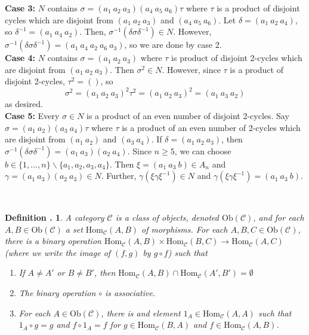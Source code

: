 \documentclass[twoside]{report}
\newcommand{\br}{\centering{ * \quad * \quad *} \\  }
\newcommand{\Ob}{\textrm{Ob}}
\newcommand{\Hom}{\textrm{Hom}}
\newcommand{\fanC}{\mathscr{C}}
\newcounter{Lecture}
\theoremstyle{myts}
\newcounter{c}[Lecture]
\newtheorem{dfn}[c]{Definition \arabic{Lecture}.}
\newcounter{ex}
\newenvironment{prf}{
  \noindent\begin{mdframed}[style=prf]}{\end{mdframed} \vspace{1em}
}
\begin{document}
\begin{prf}
  {\bf Case 3:} $N$ contains \( \sigma = ( a_1 \: a_2 \: a_3 ) ( a_4 \: a_5 \: a_6) \tau \) where $\tau$ is a product of disjoint cycles which are disjoint from \( ( a_1 \: a_2 \: a_3 ) \) and \( ( a_4 \: a_5 \: a_6 ) \). Let \( \delta = ( a_1 \: a_2 \: a_4 ) \), so \( \delta^{-1} = ( a_1 \: a_4 \: a_2 ) \). Then, \(\sigma^{-1} ( \delta\sigma\delta^{-1} ) \in N \). However, \( \sigma^{-1} ( \delta\sigma\delta^{-1} ) = ( a_1 \: a_4 \: a_2 \: a_6 \: a_3 ) \), so we are done by case 2. \\
  {\bf Case 4:} $N$ contains \( \sigma  = ( a_1 \: a_2 \: a_3 ) \) where $\tau$ is product of disjoint 2-cycles which are disjoint from \( ( a_1 \: a_2 \: a_3 ) \). Then \( \sigma^2 \in N \). However, since $\tau$ is a product of disjoint 2-cycles, \( \tau^2 = ( ) \), so
  \[
    \sigma^2 = ( a_1 \: a_2 \: a_3 )^2 \tau^2 = ( a_1 \: a_2 \: a_3 )^2 = ( a_1 \: a_3 \: a_2 )
  \]
  as desired. \\
  {\bf Case 5:} Every \( \sigma \in N \) is a product of an even number of disjoint 2-cycles. Say \( \sigma = ( a_1 \: a_2 ) ( a_3 \: a_4 ) \tau \) where $\tau$ is a product of an even number of 2-cycles which are disjoint from \( ( a_1 \: a_2 ) \) and \( ( a_3 \: a_4 ) \). If \( \delta = ( a_1 \: a_2 \: a_3 ) \), then \( \sigma^{-1} (\delta\sigma\delta^{-1}) = ( a_1 \: a_3 ) ( a_ 2 \: a_4 ) \). Since \( n \geq 5 \), we can choose \( b \in \{ 1,\ldots,n \} \backslash \{ a_1,a_2,a_3,a_4 \} \). Then \( \xi = ( a_1 \: a_3 \: b ) \in A_n \) and \( \gamma = ( a_1 \: a_3 ) ( a_2 \: a_3 ) \in N \). Further, \( \gamma ( \xi\gamma\xi^{-1} ) \in N \) and \( \gamma ( \xi\gamma\xi^{-1} ) = (a_1 \: a_3 \: b ) \).
\end{prf}

\br

\begin{dfn}
  A \emph{category} $\fanC$ is a class of objects, denoted \( \Ob(\fanC) \), and for each \( A,B \in \Ob(\fanC) \) a set \( \Hom_\fanC (A,B) \) of morphisms. For each \( A,B,C \in \Ob(\fanC) \), there is a binary operation \( \Hom_\fanC (A,B) \times \Hom_\fanC (B,C ) \to \Hom_\fanC (A,C) \) (where we write the image of \( (f,g) \) by \( g \circ f \)) such that
  \begin{enumerate}[(1)]
    \item If \(A\neq A' \) or \( B \neq B' \), then \( \Hom_\fanC (A,B) \cap \Hom_\fanC (A',B') = \emptyset \)
    \item The binary operation \( \circ \) is associative.
    \item For each \( A\in\Ob(\fanC) \), there is and element \( 1_A \in \Hom_\fanC (A,A) \) such that \( 1_A \circ g = g \) and \( f \circ 1_A = f \) for \( g\in \Hom_\fanC (B,A) \) and \( f \in \Hom_\fanC ( A, B ) \).
  \end{enumerate}
\end{dfn}
\end{document}
